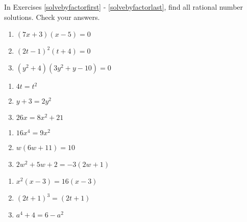 \documentclass[11pt]{article}
\theoremstyle{definition}  %
\newcounter{HW}
\begin{document}
In Exercises \ref{solvebyfactorfirst} - \ref{solvebyfactorlast},  find all rational number solutions.  Check your answers.

\begin{multicols}{3}
\begin{enumerate}
\setcounter{enumi}{\value{HW}}

\item   $(7x+3)(x-5) = 0$ \label{solvebyfactorfirst}
\item   $(2t-1)^2 (t+4) = 0$
\item   $(y^2 + 4)(3y^2 +y - 10) = 0$

\setcounter{HW}{\value{enumi}}
\end{enumerate}
\end{multicols}


\begin{multicols}{3}
\begin{enumerate}
\setcounter{enumi}{\value{HW}}

\item   $4t = t^2$
\item   $y+3 = 2y^2$
\item   $26x = 8x^2 + 21$  

\setcounter{HW}{\value{enumi}}
\end{enumerate}
\end{multicols}


\begin{multicols}{3}
\begin{enumerate}
\setcounter{enumi}{\value{HW}}

\item $16x^4 = 9x^2$
\item $w(6w+11) = 10$
\item $2w^2 + 5w + 2 = - 3(2w+1)$

\setcounter{HW}{\value{enumi}}
\end{enumerate}
\end{multicols}


\begin{multicols}{3}
\begin{enumerate}
\setcounter{enumi}{\value{HW}}

\item $x^2(x-3) = 16(x-3)$
\item $(2t+1)^3 = (2t+1)$
\item $a^4 + 4 = 6 - a^2$

\setcounter{HW}{\value{enumi}}
\end{enumerate}
\end{multicols}
\end{document}
